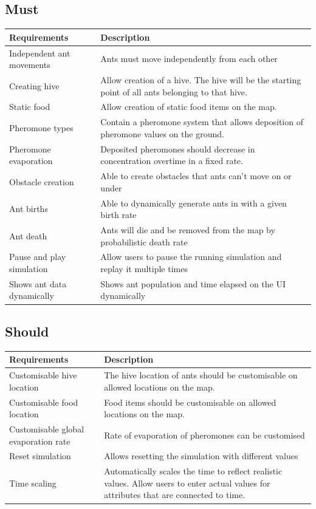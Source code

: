 \documentclass[a4paper, oneside, 11pt]{report}
\begin{document}
\subsection{Must}
\begin{tabular}{|| p{3.5cm} | p{10.5cm} ||} 
	\hline
	Requirements & Description \\
	\hline
	Independent ant movements & Ants must move independently from each other \\
	\hline
	Creating hive & Allow creation of a hive. The hive will be the starting point of all ants belonging to that hive. \\
	\hline
	Static food & Allow creation of static food items on the map. \\
	\hline
	Pheromone types & Contain a pheromone system that allows deposition of pheromone values on the ground. \\
	\hline
	Pheromone evaporation & Deposited pheromones should decrease in concentration overtime in a fixed rate. \\
	\hline
	Obstacle creation & Able to create obstacles that ants can't move on or under \\
	\hline
	Ant births & Able to dynamically generate ants in with a given birth rate \\
	\hline
	Ant death & Ants will die and be removed from the map by probabilistic death rate \\
	\hline
	Pause and play simulation & Allow users to pause the running simulation and replay it multiple times \\
	\hline
	Shows ant data dynamically & Shows ant population and time elapsed on the UI dynamically  \\
	\hline
\end{tabular}

\subsection{Should}
\begin{tabular}{||p{3.5cm} | p{10.5cm} ||} 
	\hline
	Requirements & Description \\
	\hline
	Customisable hive location & The hive location of ants should be customisable on allowed locations on the map. \\
	\hline
	Customisable food location & Food items should be customisable on allowed locations on the map. \\
	\hline
	Customisable global evaporation rate & Rate of evaporation of pheromones can be customised\\
	\hline
	Reset simulation & Allows resetting the simulation with different values \\
	\hline
	Time scaling & Automatically scales the time to reflect realistic values. Allow users to enter actual values for attributes that are connected to time.\\
	\hline
\end{tabular}
\end{document}
